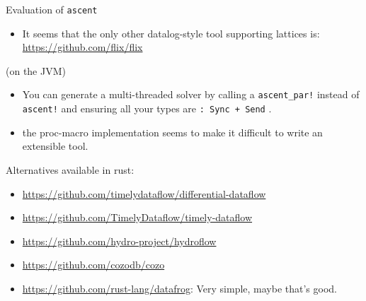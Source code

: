 \documentclass[presentation]{beamer}
\begin{document}
\begin{frame}[label={sec:org1f4e5c2},fragile]{Evaluation of \texttt{ascent}}
 \begin{itemize}
\item It seems that the only other datalog-style tool supporting lattices is: \url{https://github.com/flix/flix}
\end{itemize}
(on the JVM)

\begin{itemize}
\item You can generate a multi-threaded solver by calling a \texttt{ascent\_par!} instead of \texttt{ascent!} and ensuring all your types are \texttt{: Sync + Send} .

\item the proc-macro implementation seems to make it difficult to write an extensible tool.
\end{itemize}

Alternatives available in rust:
\begin{itemize}
\item \url{https://github.com/timelydataflow/differential-dataflow}
\item \url{https://github.com/TimelyDataflow/timely-dataflow}
\item \url{https://github.com/hydro-project/hydroflow}
\item \url{https://github.com/cozodb/cozo}
\item \url{https://github.com/rust-lang/datafrog}:
Very simple, maybe that's good.
\end{itemize}
\end{frame}
\end{document}
